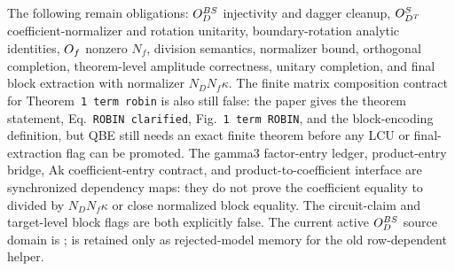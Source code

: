 The following remain obligations: \(O_D^{BS}\) injectivity and dagger cleanup,
\(O_{D^T}^{S}\) coefficient-normalizer and rotation unitarity,
boundary-rotation analytic identities, \(O_f\) nonzero \(N_f\), division
semantics, normalizer bound, orthogonal completion, theorem-level amplitude
correctness, unitary completion, and final block extraction with normalizer
\(N_DN_f\kappa\).  The finite matrix composition contract for
Theorem~\texttt{1 term robin} is also still false: the paper gives the theorem
statement, Eq.~\texttt{ROBIN clarified}, Fig.~\texttt{1 term ROBIN}, and the
block-encoding definition, but QBE still needs an exact finite theorem before
any LCU or final-extraction flag can be promoted.  The gamma3 factor-entry
ledger, product-entry bridge, Ak coefficient-entry contract, and
product-to-coefficient interface are synchronized dependency maps: they do not
prove the coefficient equality to  divided by
\(N_DN_f\kappa\) or close normalized block equality.  The circuit-claim and
target-level block flags are both explicitly false.  The current active
\(O_D^{BS}\) source domain is
;
 is retained only as rejected-model
memory for the old row-dependent helper.


